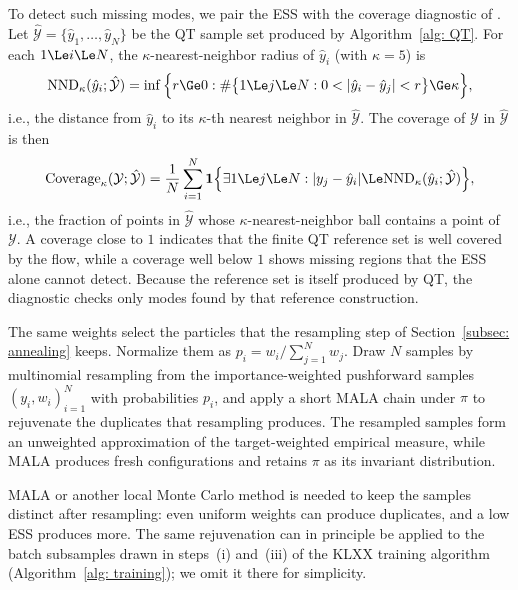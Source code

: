 \documentclass{article}
\begin{document}
To detect such missing modes, we pair the ESS with the coverage diagnostic of \citet{naeem2020reliable}. Let $\hat{\mathcal Y} = \{\hat y_1,\dots,\hat y_N\}$ be the QT sample set produced by Algorithm~\ref{alg: QT}. For each $1 \Le i \Le N$, the $\kappa$-nearest-neighbor radius of $\hat y_i$ (with $\kappa = 5$) is
\begin{equation}
    \mathrm{NND}_\kappa(\hat y_i;{\hat{\mathcal Y}}) = \inf\Big\{ r \Ge 0 :
    \# \big\{1\Le j \Le N: 0 < |\hat y_i - \hat y_j| < r\big\} \Ge \kappa
    \Big\},
\end{equation}
i.e., the distance from $\hat y_i$ to its $\kappa$-th nearest neighbor in $\hat{\mathcal Y}$. The coverage of $\mathcal Y$ in $\hat{\mathcal Y}$ is then
\begin{equation}
    \mathrm{Coverage}_\kappa({\mathcal Y;\hat{\mathcal Y}}) =
    \frac{1}{N} \sum_{i=1}^{N} \mathbf 1\Bigl\{
        \exists  1\Le j\Le N : |y_j - \hat y_i| \Le \mathrm{NND}_\kappa(\hat y_i;\hat{\mathcal Y})
    \Bigr\},
\end{equation}
i.e., the fraction of points in $\hat{\mathcal Y}$ whose $\kappa$-nearest-neighbor ball contains a point of $\mathcal Y$. A coverage close to $1$ indicates that the finite QT reference set is well covered by the flow, while a coverage well below $1$ shows missing regions that the ESS alone cannot detect. Because the reference set is itself produced by QT, the diagnostic checks only modes found by that reference construction.

The same weights select the particles that the resampling step of Section~\ref{subsec: annealing} keeps. Normalize them as $p_i=w_i/\sum_{j=1}^{N}w_j$. Draw $N$ samples by multinomial resampling from the importance-weighted pushforward samples $(y_i,w_i)_{i=1}^{N}$ with probabilities $p_i$, and apply a short MALA chain under $\pi$ to rejuvenate the duplicates that resampling produces. The resampled samples form an unweighted approximation of the target-weighted empirical measure, while MALA produces fresh configurations and retains $\pi$ as its invariant distribution.

\begin{remark}
	MALA or another local Monte Carlo method is needed to keep the samples distinct after resampling: even uniform weights can produce duplicates, and a low ESS produces more. The same rejuvenation can in principle be applied to the batch subsamples drawn in steps~(i) and~(iii) of the KLXX training algorithm (Algorithm~\ref{alg: training}); we omit it there for simplicity.
\end{remark}
\end{document}
